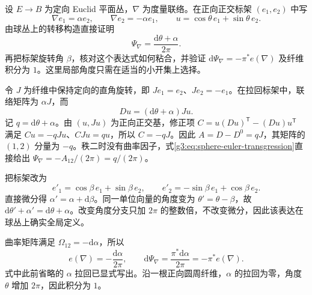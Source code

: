 \begin{exercise}\label{g3:ex:rank-two-angular-form}
	设 \(E\to B\) 为定向 Euclid 平面丛，\(\nabla\) 为度量联络。在正向正交标架 \((e_1,e_2)\) 中写
	\[
		\nabla e_1=\alpha e_2,\qquad \nabla e_2=-\alpha e_1,
		\qquad u=\cos\theta\,e_1+\sin\theta\,e_2.
	\]
	由球丛上的转移构造直接证明
	\[
		\Psi_\nabla=\frac{\mathrm d\theta+\alpha}{2\pi}.
	\]
	再把标架旋转角 \(\beta\)，核对这个表达式如何粘合，并验证 \(\mathrm d\Psi_\nabla=-\pi^*e(\nabla)\) 及纤维积分为 \(1\)。这里局部角度只需在适当的小开集上选择。
\end{exercise}
\begin{solution}
	令 \(J\) 为纤维中保持定向的直角旋转，即 \(Je_1=e_2\)、\(Je_2=-e_1\)。在拉回标架中，联络矩阵为 \(\alpha J\)，而
	\[
		Du=(\mathrm d\theta+\alpha)Ju.
	\]
	记 \(q=\mathrm d\theta+\alpha\)。由 \((u,Ju)\) 为正向正交基，修正项
	\(C=u(Du)^{\mathsf T}-(Du)u^{\mathsf T}\)
	满足 \(Cu=-qJu\)、\(CJu=qu\)，所以 \(C=-qJ\)。因此 \(A=D-D^0=qJ\)，其矩阵的 \((1,2)\) 分量为 \(-q\)。秩二时没有曲率因子，式\eqref{g3:eq:sphere-euler-transgression}直接给出 \(\Psi_\nabla=-A_{12}/(2\pi)=q/(2\pi)\)。

	把标架改为
	\[
		e'_1=\cos\beta\,e_1+\sin\beta\,e_2,
		\qquad e'_2=-\sin\beta\,e_1+\cos\beta\,e_2.
	\]
	直接微分得 \(\alpha'=\alpha+\mathrm d\beta\)。同一单位向量的角度变为 \(\theta'=\theta-\beta\)，故
	\(\mathrm d\theta'+\alpha'=\mathrm d\theta+\alpha\)。改变角度分支只加 \(2\pi\) 的整数倍，不改变微分，因此该表达在球丛上确实全局定义。

	曲率矩阵满足 \(\Omega_{12}=-\mathrm d\alpha\)，所以
	\[
		e(\nabla)=-\frac{\mathrm d\alpha}{2\pi},
		\qquad \mathrm d\Psi_\nabla=\frac{\pi^*\mathrm d\alpha}{2\pi}=-\pi^*e(\nabla).
	\]
	式中此前省略的 \(\alpha\) 拉回已显式写出。沿一根正向圆周纤维，\(\alpha\) 的拉回为零，角度 \(\theta\) 增加 \(2\pi\)，因此积分为 \(1\)。
\end{solution}

